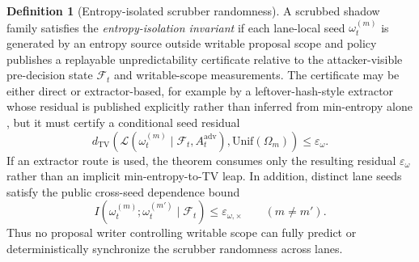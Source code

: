\documentclass[11pt]{article}
\theoremstyle{definition}
\newtheorem{definition}[theorem]{Definition}
\newcommand{\1}{\mathbf{1}}
\begin{document}
\begin{definition}[Entropy-isolated scrubber randomness]\label{def:entropy_isolation}
A scrubbed shadow family satisfies the \emph{entropy-isolation invariant} if each lane-local seed $\omega_t^{(m)}$ is generated by an entropy source outside writable proposal scope and policy publishes a replayable unpredictability certificate relative to the attacker-visible pre-decision state $\mathcal F_t$ and writable-scope measurements. The certificate may be either direct or extractor-based, for example by a leftover-hash-style extractor whose residual is published explicitly rather than inferred from min-entropy alone \cite{BarakEtAl2011LHL,NIST90B2018}, but it must certify a conditional seed residual
\[
d_{\mathrm{TV}}\!\left(\mathcal L(\omega_t^{(m)}\mid \mathcal F_t,A_t^{\mathrm{adv}}),\mathrm{Unif}(\Omega_m)\right) \le \varepsilon_{\omega}.
\]
If an extractor route is used, the theorem consumes only the resulting residual $\varepsilon_{\omega}$ rather than an implicit min-entropy-to-TV leap. In addition, distinct lane seeds satisfy the public cross-seed dependence bound
\[
I\!\left(\omega_t^{(m)};\omega_t^{(m')} \mid \mathcal F_t\right) \le \varepsilon_{\omega,\times}
\qquad(m\neq m').
\]
Thus no proposal writer controlling writable scope can fully predict or deterministically synchronize the scrubber randomness across lanes.
\end{definition}
\end{document}
